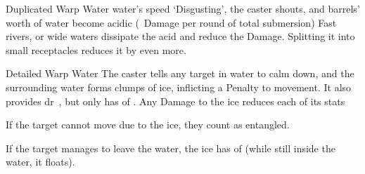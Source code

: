 \ifodd\value{diceNo}

  {Duplicated}%
  {Warp}%
  {Water}%
  {water's speed}%
  {`Disgusting', the caster shouts, and  barrels' worth of water become acidic (\showDam~Damage per \gls{round} of total submersion)}%
  {
    Fast rivers, or wide waters dissipate the acid and reduce the Damage.
	Splitting it into small receptacles reduces it by even more.%
  }

\else

  {Detailed}%
  {Warp}%
  {Water}%
  {}%
  {The caster tells any target in water to calm down, and the surrounding water forms clumps of ice, inflicting a  Penalty to movement.
  It also provides \gls{dr}~, but only has  of .
  Any Damage to the ice reduces each of its stats}%
  {
  If the target cannot move due to the ice, they count as entangled.

  If the target manages to leave the water, the ice has  of  (while still inside the water, it floats).}

\fi
{}
